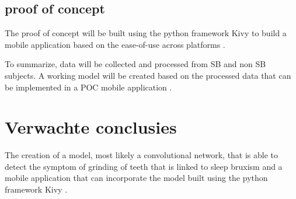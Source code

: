 \documentclass{hogent-article}
\begin{document}
\subsection{proof of concept}

The proof of concept will be built using the python framework Kivy to build a mobile application based on the ease-of-use across platforms .

To summarize, data will be collected and processed from SB and non SB subjects.
A working model will be created based on the processed data that can be implemented in a POC mobile application .



\section{Verwachte conclusies}


The creation of a model, most likely a convolutional network, that is able to detect the symptom of grinding of teeth that is linked to sleep bruxism and a mobile application that can incorporate the model built using the python framework Kivy .





\printbibliography
\end{document}
